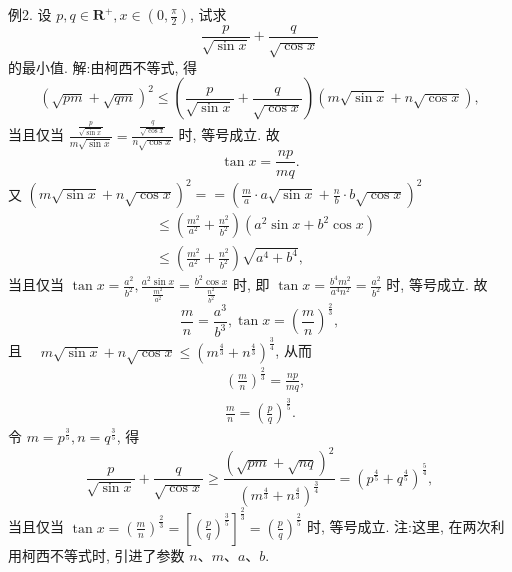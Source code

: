 例2. 设 $p, q \in \mathbf{R}^{+}, x \in\left(0, \frac{\pi}{2}\right)$, 试求
$$
\frac{p}{\sqrt{\sin x}}+\frac{q}{\sqrt{\cos x}}
$$
的最小值.
解:由柯西不等式, 得
$$
(\sqrt{p m}+\sqrt{q m})^2 \leqslant\left(\frac{p}{\sqrt{\sin x}}+\frac{q}{\sqrt{\cos x}}\right)(m \sqrt{\sin x}+n \sqrt{\cos x}),
$$
当且仅当 $\frac{\frac{p}{\sqrt{\sin x}}}{m \sqrt{\sin x}}=\frac{\frac{q}{\sqrt{\cos x}}}{n \sqrt{\cos x}}$ 时, 等号成立.
故
$$
\tan x=\frac{n p}{m q} .
$$
又 $(m \sqrt{\sin x}+n \sqrt{\cos x})^2==\left(\frac{m}{a} \cdot a \sqrt{\sin x}+\frac{n}{b} \cdot b \sqrt{\cos x}\right)^2$
$$
\begin{aligned}
& \leqslant\left(\frac{m^2}{a^2}+\frac{n^2}{b^2}\right)\left(a^2 \sin x+b^2 \cos x\right) \\
& \leqslant\left(\frac{m^2}{a^2}+\frac{n^2}{b^2}\right) \sqrt{a^4+b^4},
\end{aligned}
$$
当且仅当 $\tan x=\frac{a^2}{b^2}, \frac{a^2 \sin x}{\frac{m^2}{a^2}}=\frac{b^2 \cos x}{\frac{n^2}{b^2}}$ 时, 即 $\tan x=\frac{b^4 m^2}{a^4 n^2}=\frac{a^2}{b^2}$ 时, 等号成立.
故
$$
\frac{m}{n}=\frac{a^3}{b^3}, \tan x=\left(\frac{m}{n}\right)^{\frac{2}{3}},
$$
且 $\quad m \sqrt{\sin x}+n \sqrt{\cos x} \leqslant\left(m^{\frac{4}{3}}+n^{\frac{4}{3}}\right)^{\frac{3}{4}}$,
从而
$$
\begin{aligned}
& \left(\frac{m}{n}\right)^{\frac{2}{3}}=\frac{n p}{m q}, \\
& \frac{m}{n}=\left(\frac{p}{q}\right)^{\frac{3}{5}} .
\end{aligned}
$$
令 $m=p^{\frac{3}{5}}, n=q^{\frac{3}{5}}$, 得
$$
\frac{p}{\sqrt{\sin x}}+\frac{q}{\sqrt{\cos x}} \geqslant \frac{(\sqrt{p m}+\sqrt{n q})^2}{\left(m^{\frac{4}{3}}+n^{\frac{4}{3}}\right)^{\frac{3}{4}}}=\left(p^{\frac{4}{5}}+q^{\frac{4}{5}}\right)^{\frac{5}{4}},
$$
当且仅当 $\tan x=\left(\frac{m}{n}\right)^{\frac{2}{3}}=\left[\left(\frac{p}{q}\right)^{\frac{3}{5}}\right]^{\frac{2}{3}}=\left(\frac{p}{q}\right)^{\frac{2}{5}}$ 时, 等号成立.
注:这里, 在两次利用柯西不等式时, 引进了参数 $n 、 m 、 a 、 b$.



